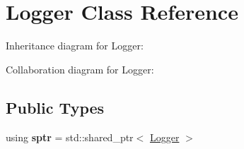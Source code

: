 \hypertarget{classLogger}{}\section{Logger Class Reference}
\label{classLogger}


Inheritance diagram for Logger\+:


Collaboration diagram for Logger\+:
\subsection*{Public Types}
\begin{DoxyCompactItemize}
\item 
\mbox{\label{classLogger_a0477ca1e07615ec4d39b52b5f8b045bb}} 
using {\bfseries sptr} = std\+::shared\+\_\+ptr$<$ \hyperlink{classLogger}{Logger} $>$
\end{DoxyCompactItemize}
